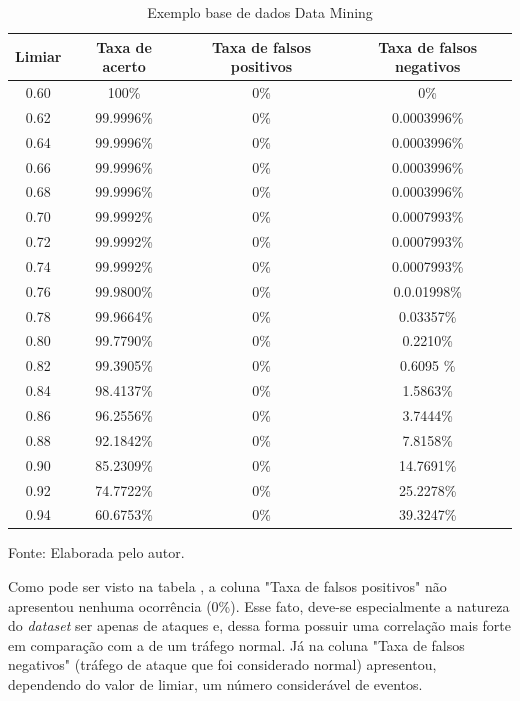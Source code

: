  \begin{table}[htb]
 	\centering
 	\begin{threeparttable}
 		\caption{Exemplo base de dados Data Mining}
 		\label{Tab:ResultsMining}
 		\begin{tabular}{c c c c}
 			\toprule
 			\textbf{Limiar} & \textbf{Taxa de acerto} & \textbf{Taxa de falsos positivos} & \textbf{Taxa de falsos negativos}
 			\\ \midrule
	 			
 			0.60 &  100\% &  0\%& 0\%   \\ \midrule
 			0.62 &  99.9996\% &  0\%& 0.0003996\%   \\ \midrule
 			0.64 &  99.9996\% &  0\%& 0.0003996\%   \\ \midrule
 			0.66 &  99.9996\% &  0\%& 0.0003996\%   \\ \midrule
 			0.68 &  99.9996\% &  0\%& 0.0003996\%   \\ \midrule
 			0.70 &  99.9992\% &  0\%& 0.0007993\%   \\ \midrule
 			0.72 &  99.9992\% &  0\%& 0.0007993\%   \\ \midrule
 			0.74 &  99.9992\% &  0\%& 0.0007993\%   \\ \midrule
 			0.76 &  99.9800\% &  0\%& 0.0.01998\%   \\ \midrule
 			0.78 &  99.9664\% &  0\%& 0.03357\%   \\\midrule 		 			 			 			 			 			 			 			
 			0.80 &  99.7790\% &  0\%& 0.2210\%   \\ \midrule
 			0.82 &  99.3905\% & 0\% & 0.6095 \%   \\ \midrule
 			0.84 &  98.4137\%  & 0\% & 1.5863\%   \\ \midrule
 			0.86 &  96.2556\%  &  0\% & 3.7444\%   \\ \midrule
 			0.88 &  92.1842\%  &  0\% & 7.8158\%     \\ \midrule
 			0.90 &  85.2309\%  & 0\% & 14.7691\%    \\ \midrule
 			0.92 &  74.7722\%  &  0\% & 25.2278\%   \\ \midrule
 			0.94 &  60.6753\%  & 0\% & 39.3247\%   \\ \bottomrule
 		\end{tabular}
 		{Fonte: Elaborada pelo autor.}
 	\end{threeparttable}
 \end{table}
Como pode ser visto na tabela , a coluna "Taxa de falsos positivos" não apresentou nenhuma ocorrência (0\%). Esse fato, deve-se especialmente a natureza do \textit{dataset} ser apenas de ataques e, dessa forma possuir uma correlação mais forte em comparação com a de um tráfego normal. Já na coluna "Taxa de falsos negativos" (tráfego de ataque que foi considerado normal) apresentou, dependendo do valor de limiar, um número considerável de eventos.
